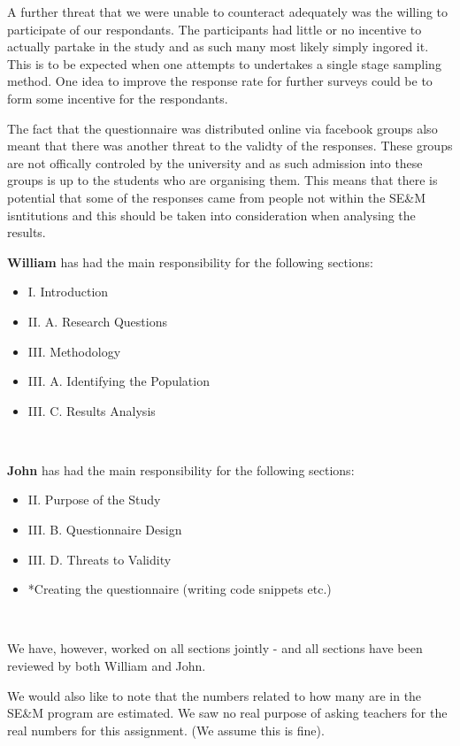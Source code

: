 \documentclass[times, 10pt,twocolumn]{IEEEtran}
\begin{document}
A further threat that we were unable to counteract adequately was the willing to participate of our respondants. The participants had little or no incentive to actually partake in the study and as such many most likely simply ingored it. This is to be expected when one attempts to undertakes a single stage sampling method. One idea to improve the response rate for further surveys could be to form some incentive for the respondants.
\newline

The fact that the questionnaire was distributed online via facebook groups also meant that there was another threat to the validty of the responses. These groups are not offically controled by the university and as such admission into these groups is up to the students who are organising them. This means that there is potential that some of the responses came from people not within the SE\&M isntitutions and this should be taken into consideration when analysing the results.






\vfill
\eject


\textbf{William} has had the main responsibility for the following sections:
\begin{itemize} \renewcommand{\labelitemi}{$\bullet$} 
\item I. Introduction
\item II. A. Research Questions
\item III. Methodology
\item III. A. Identifying the Population
\item III. C. Results Analysis
\end{itemize}
\ 


\textbf{John} has had the main responsibility for the following sections:
\begin{itemize} \renewcommand{\labelitemi}{$\bullet$} 
\item II. Purpose of the Study
\item III. B. Questionnaire Design
\item III. D. Threats to Validity
\item *Creating the questionnaire (writing code snippets etc.)
\end{itemize}
\

We have, however, worked on all sections jointly - and all sections have been reviewed by both William and John. 
\newline

We would also like to note that the numbers related to how many are in the SE\&M program are estimated. We saw no real purpose of asking teachers for the real numbers for this assignment. (We assume this is fine). 
\end{document}
